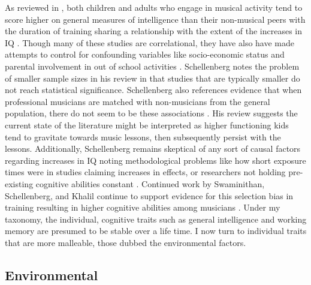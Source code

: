 \documentclass[12pt,]{book}
\begin{document}
As reviewed in \citet{schellenbergMusicNonmusicalAbilities2017}, both children and adults who engage in musical activity tend to score higher on general measures of intelligence than their non-musical peers \citep{gibsonEnhancedDivergentThinking2009, hilleAssociationsMusicEducation2011, schellenbergExaminingAssociationMusic2011, schellenbergMusicTrainingEmotion2012} with the duration of training sharing a relationship with the extent of the increases in IQ \citep{corrigallPredictingWhoTakes2015, degeMusicLessonsIntelligence2011, schellenbergLongtermPositiveAssociations2006}.
Though many of these studies are correlational, they have also have made attempts to control for confounding variables like socio-economic status and parental involvement in out of school activities \citep{corrigallAssociationsLengthMusic2011, degeMusicLessonsIntelligence2011, schellenbergExaminingAssociationMusic2011, schellenbergMusicTrainingEmotion2012}.
Schellenberg notes the problem of smaller sample sizes in his review \citep{corrigallAssociationsLengthMusic2011, parbery-clarkMusicalExperienceAging2011, straitMusicalTrainingEarly2012} in that studies that are typically smaller do not reach statistical significance.
Schellenberg also references evidence that when professional musicians are matched with non-musicians from the general population, there do not seem to be these associations \citep{schellenbergLongtermPositiveAssociations2006}.
His review suggests the current state of the literature might be interpreted as higher functioning kids tend to gravitate towards music lessons, then subsequently persist with the lessons.
Additionally, Schellenberg remains skeptical of any sort of causal factors regarding increases in IQ \citep{francoisMusicTrainingDevelopment2013, morenoMusicalTrainingInfluences2009} noting methodological problems like how short exposure times were in studies claiming increases in effects, or researchers not holding pre-existing cognitive abilities constant \citep{mehrTwoRandomizedTrials2013}.
Continued work by Swaminithan, Schellenberg, and Khalil continue to support evidence for this selection bias in training resulting in higher cognitive abilities among musicians \citep{swaminathanRevisitingAssociationMusic2017}.
Under my taxonomy, the individual, cognitive traits such as general intelligence and working memory are presumed to be stable over a life time.
I now turn to individual traits that are more malleable, those dubbed the environmental factors.

\hypertarget{environmental}{%
\subsection{Environmental}\label{environmental}}
\end{document}
